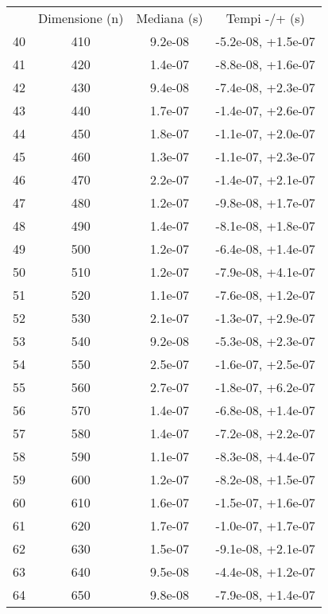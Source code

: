 \begin{table}
\centering
\begin{adjustbox}{width=1\textwidth/2}
\begin{tabular}{|c|c|c|c|}
\hline
 & Dimensione (n) & Mediana (s) & Tempi -/+ (s) \\
40 & 410 & 9.2e-08 & -5.2e-08, +1.5e-07 \\
\cline{1-4}
41 & 420 & 1.4e-07 & -8.8e-08, +1.6e-07 \\
\cline{1-4}
42 & 430 & 9.4e-08 & -7.4e-08, +2.3e-07 \\
\cline{1-4}
43 & 440 & 1.7e-07 & -1.4e-07, +2.6e-07 \\
\cline{1-4}
44 & 450 & 1.8e-07 & -1.1e-07, +2.0e-07 \\
\cline{1-4}
45 & 460 & 1.3e-07 & -1.1e-07, +2.3e-07 \\
\cline{1-4}
46 & 470 & 2.2e-07 & -1.4e-07, +2.1e-07 \\
\cline{1-4}
47 & 480 & 1.2e-07 & -9.8e-08, +1.7e-07 \\
\cline{1-4}
48 & 490 & 1.4e-07 & -8.1e-08, +1.8e-07 \\
\cline{1-4}
49 & 500 & 1.2e-07 & -6.4e-08, +1.4e-07 \\
\cline{1-4}
50 & 510 & 1.2e-07 & -7.9e-08, +4.1e-07 \\
\cline{1-4}
51 & 520 & 1.1e-07 & -7.6e-08, +1.2e-07 \\
\cline{1-4}
52 & 530 & 2.1e-07 & -1.3e-07, +2.9e-07 \\
\cline{1-4}
53 & 540 & 9.2e-08 & -5.3e-08, +2.3e-07 \\
\cline{1-4}
54 & 550 & 2.5e-07 & -1.6e-07, +2.5e-07 \\
\cline{1-4}
55 & 560 & 2.7e-07 & -1.8e-07, +6.2e-07 \\
\cline{1-4}
56 & 570 & 1.4e-07 & -6.8e-08, +1.4e-07 \\
\cline{1-4}
57 & 580 & 1.4e-07 & -7.2e-08, +2.2e-07 \\
\cline{1-4}
58 & 590 & 1.1e-07 & -8.3e-08, +4.4e-07 \\
\cline{1-4}
59 & 600 & 1.2e-07 & -8.2e-08, +1.5e-07 \\
\cline{1-4}
60 & 610 & 1.6e-07 & -1.5e-07, +1.6e-07 \\
\cline{1-4}
61 & 620 & 1.7e-07 & -1.0e-07, +1.7e-07 \\
\cline{1-4}
62 & 630 & 1.5e-07 & -9.1e-08, +2.1e-07 \\
\cline{1-4}
63 & 640 & 9.5e-08 & -4.4e-08, +1.2e-07 \\
\cline{1-4}
64 & 650 & 9.8e-08 & -7.9e-08, +1.4e-07 \\

\end{tabular}
\end{adjustbox}
\end{table}
